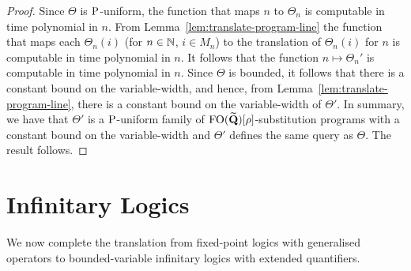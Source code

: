 \documentclass[../main/thesis.tex]{subfiles}
\begin{document}
\begin{proof}
  Since $\Theta$ is $\mathrm{P}$-uniform, the function that maps $n$ to $\Theta_n$ is
  computable in time polynomial in $n$. From
  Lemma~\ref{lem:translate-program-line} the function that maps each
  $\Theta_n(i)$ (for $n \in \mathbb{N}$, $i \in M_n$) to the translation of
  $\Theta_n(i)$ for $n$ is computable in time polynomial in $n$. It follows that
  the function $n \mapsto \Theta_n'$ is computable in time polynomial in $n$.
  Since $\Theta$ is bounded, it follows that there is a constant bound on the
  variable-width, and hence, from Lemma~\ref{lem:translate-program-line}, there
  is a constant bound on the variable-width of $\Theta'$. In summary, we have
  that $\Theta'$ is a $\mathrm{P}$-uniform family of
  $\text{\upshape FO} (\widetilde{\mathbf{Q}})[\rho]$-substitution programs with a constant bound
  on the variable-width and $\Theta'$ defines the same query as $\Theta$. The
  result follows.
\end{proof}

\section{Infinitary Logics}
\label{chpt:gen-op--sec:fp-to-inf}
We now complete the translation from fixed-point logics with generalised
operators to bounded-variable infinitary logics with extended
quantifiers. %



\end{document}
